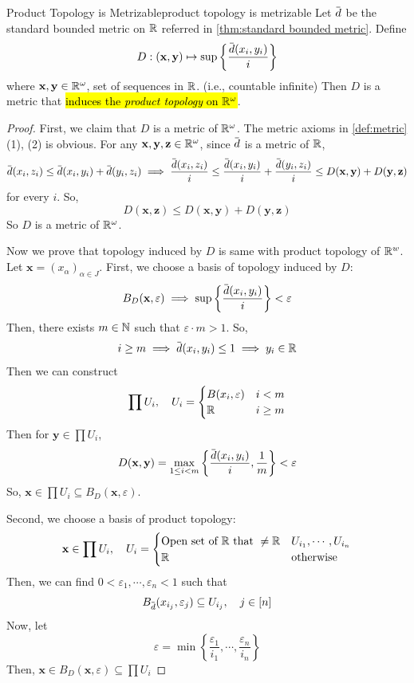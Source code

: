 \documentclass[12pt, a4paper, twoside]{article}
\newcommand{\overbar}[1]{\mkern 1.5mu\overline{\mkern-1.5mu#1\mkern-1.5mu}\mkern 1.5mu}
\theoremstyle{plain}
\begin{document}
\begin{thm}{Product Topology is Metrizable}{product topology is metrizable}
    Let $\overbar{d}$ be the standard bounded metric on ${\mathbb {R}}$ referred in \ref{thm:standard bounded metric}. 
    Define 
    \[D: (\mathbf{x}, \mathbf{y}) \mapsto \sup \left\{\frac{\overbar{d}(x_i, y_i)}{i}\right\}\]
    where $\mathbf{x}, \mathbf{y} \in {\mathbb {R}}^\omega$, set of sequences in ${\mathbb {R}}$. (i.e., countable infinite) 
    Then $D$ is a metric that \hl{induces the \textit{product topology} on ${\mathbb {R}}^\omega$}. 
\end{thm}

\begin{proof}
    First, we claim that $D$ is a metric of ${\mathbb {R}}^\omega$. The metric axioms in \ref{def:metric} (1), (2) is obvious. 
    For any $\mathbf{x}, \mathbf{y}, \mathbf{z} \in {\mathbb {R}}^\omega$, since $\overbar{d}$ is a metric of ${\mathbb {R}}$,
    \[\overbar{d}(x_i, z_i) \leq \overbar{d}(x_i, y_i) + \overbar{d}(y_i, z_i) \implies \frac{\overbar{d}(x_i, z_i)}{i} \leq \frac{\overbar{d}(x_i, y_i)}{i} + \frac{\overbar{d}(y_i, z_i)}{i} \leq D(\mathbf{x}, \mathbf{y}) + D(\mathbf{y}, \mathbf{z})\]
    for every $i$. So, 
    \[D(\mathbf{x}, \mathbf{z}) \leq D(\mathbf{x}, \mathbf{y}) + D(\mathbf{y}, \mathbf{z})\]
    So $D$ is a metric of ${\mathbb {R}}^\omega$. 

    Now we prove that topology induced by $D$ is same with product topology of ${\mathbb {R}}^w$. 
    Let $\mathbf{x} = (x_\alpha)_{\alpha \in J}$. First, we choose a basis of topology induced by $D$: 
    \[B_D(\mathbf{x}, \varepsilon) \implies \sup \left\{\frac{\overbar{d}(x_i, y_i)}{i}\right\} < \varepsilon\]
    Then, there exists $m \in {\mathbb {N}}$ such that $\varepsilon \cdot m > 1$. So, 
    \[i \geq m \implies \overbar{d}(x_i, y_i) \leq 1 \implies y_i \in \BR\]
    Then we can construct 
    \[\prod U_i , \quad U_i = \begin{cases}
        B(x_i, \varepsilon) & i < m \\
        {\mathbb {R}} & i \geq m
    \end{cases}\]
    Then for $\mathbf{y} \in \prod U_i$, 
    \[D(\mathbf{x}, \mathbf{y}) = \max_{1 \leq i < m}\left\{\frac{\overbar{d}(x_i, y_i)}{i}, \frac{1}{m}\right\} < \varepsilon\] 
    So, $\mathbf{x} \in \prod U_i \subseteq B_D(\mathbf{x}, \varepsilon)$. 

    Second, we choose a basis of product topology: 
    \[\mathbf{x} \in \prod U_i, \quad U_i = \begin{cases}
        \text{Open set of ${\mathbb {R}}$ that }\neq {\mathbb {R}} & U_{i_1}, \cdots, U_{i_n} \\
        {\mathbb {R}} & \text{otherwise}
    \end{cases}\]
    Then, we can find $0 < \varepsilon_1, \cdots, \varepsilon_n < 1$ such that 
    \[B_{\overbar{d}}(x_{i_j}, \varepsilon_j) \subseteq U_{i_j}, \quad j \in [n]\]
    Now, let 
    \[\varepsilon = \min \left\{\frac{\varepsilon_1}{i_1}, \cdots, \frac{\varepsilon_n}{i_n}\right\}\]
    Then, $\mathbf{x} \in B_D(\mathbf{x}, \varepsilon) \subseteq \prod U_i$
\end{proof}
\end{document}
